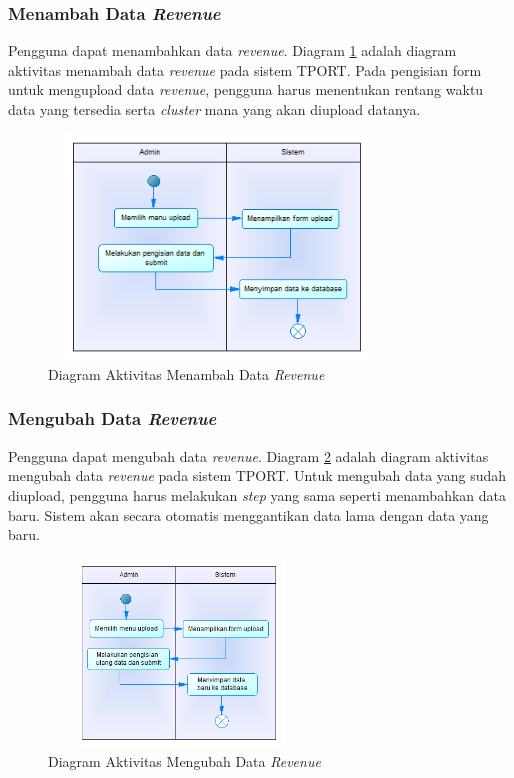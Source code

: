 	\subsubsection{Menambah Data \textit{Revenue}}
	Pengguna dapat menambahkan data \textit{revenue}. Diagram \ref{figure:activity_menambah_data_revenue} adalah diagram aktivitas menambah data \textit{revenue} pada sistem TPORT. Pada pengisian form untuk mengupload data \textit{revenue}, pengguna harus menentukan rentang waktu data yang tersedia serta \textit{cluster} mana yang akan diupload datanya.
	
	\begin{figure}[h]
	\centerline {\includegraphics[width=9cm,height=6cm]{bab4/activity_menambah_data_revenue.png}}
	\caption{Diagram Aktivitas Menambah Data \textit{Revenue}}
	\label{figure:activity_menambah_data_revenue}
	\end{figure}
		
	\subsubsection{Mengubah Data \textit{Revenue}}
	Pengguna dapat mengubah data \textit{revenue}. Diagram \ref{figure:activity_mengubah_data_revenue} adalah diagram aktivitas mengubah data \textit{revenue} pada sistem TPORT. Untuk mengubah data yang sudah diupload, pengguna harus melakukan \textit{step} yang sama seperti menambahkan data baru. Sistem akan secara otomatis menggantikan data lama dengan data yang baru.
	
	\begin{figure}[h]
	\centerline {\includegraphics[width=7cm,height=5cm]{bab4/activity_mengubah_data_revenue.png}}
	\caption{Diagram Aktivitas Mengubah Data \textit{Revenue}}
	\label{figure:activity_mengubah_data_revenue}
	\end{figure}

